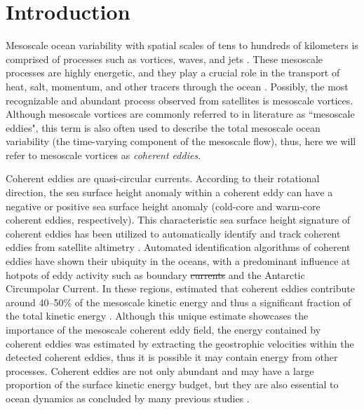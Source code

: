 \documentclass[draft,linenumbers]{agujournal2019}
\providecommand{\DIFadd}[1]{{\protect\color{blue}\uwave{#1}}} %
\providecommand{\DIFdel}[1]{{\protect\color{red}\sout{#1}}}                      %
\providecommand{\DIFaddbegin}{} %
\providecommand{\DIFaddend}{} %
\providecommand{\DIFdelbegin}{} %
\providecommand{\DIFdelend}{} %
\begin{document}
\section{Introduction}

Mesoscale ocean variability with spatial scales of tens to hundreds of kilometers is comprised of processes such as vortices, waves, and jets \citep{Ferrari_energy_2009, Fu_Eddy_2010}. 
These mesoscale processes are highly energetic, and they play a crucial role in the transport of heat, salt, momentum, and other tracers through the ocean \citep{Wunsch_energetics_2004, Wyrtki_Eddy_1976, Gill_Energy_1974}. Possibly, the most recognizable and abundant process observed from satellites is mesoscale vortices. Although mesoscale vortices are commonly referred to in literature as ``mesoscale eddies", this term is also often used to describe the total mesoscale ocean variability (the time-varying component of the mesoscale flow), thus, here we will refer to mesoscale vortices as \emph{coherent eddies}. 


Coherent eddies are quasi-circular currents. According to their rotational direction, the sea surface height anomaly within a coherent eddy can have a negative or positive sea surface height anomaly (cold-core and warm-core coherent eddies, respectively). 
This characteristic sea surface height signature of coherent eddies has been utilized to automatically identify and track coherent eddies from satellite altimetry \citep{Cui_eddy_identification_2020,Martinez_TKE_2019, Ashkezari_eddies_2016, Faghmous_A_2015,Chelton_Global_2007}. 
Automated identification algorithms of coherent eddies have shown their ubiquity in the oceans, with a predominant influence at hotpots of eddy activity such as boundary \DIFdelbegin \DIFdel{currents }\DIFdelend \DIFaddbegin \DIFadd{extensions }\DIFaddend and the Antarctic Circumpolar Current. In these regions, \citet{Chelton_The_2011} estimated that coherent eddies contribute around 40--50\% of the mesoscale kinetic energy \citep{Chelton_The_2011} and thus a significant fraction of the total kinetic energy \citep{Ferrari_energy_2009}. 
Although this unique estimate showcases the importance of the mesoscale coherent eddy field, the energy contained by coherent eddies was estimated by extracting the geostrophic velocities within the detected coherent eddies, thus it is possible it may contain energy from other processes. 
Coherent eddies are not only abundant and may have a large proportion of the surface kinetic energy budget, but they are also essential to ocean dynamics as concluded by many previous studies \citep{Patel_SO_eddies_2020,Schubert_submesoscale_2019,Pilo_eddy_2015,Frenger_Southern_2015,Frenger_Imprint_2013,BeronVera_Agulhas_2013,Siegel_Bio_2011,Hogg_Interdecadal_2006}.
\end{document}
